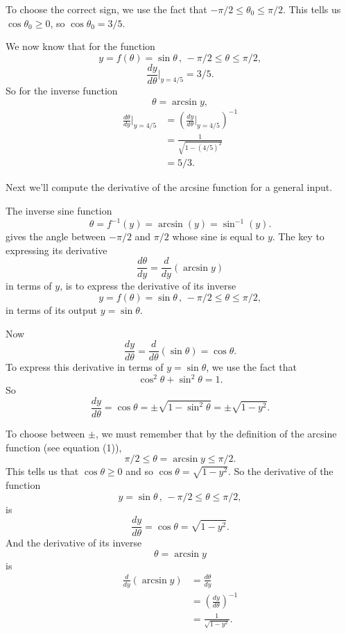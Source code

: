 \documentclass{ximera}
\begin{document}
\begin{example}
To choose the correct sign, we use the fact that $-\pi/2 \leq \theta_0 \leq \pi/2$. This tells us $\cos\theta_0 \geq 0$, so $\cos\theta_0 = 3/5$.

We now know that for the function
\[
  y = f(\theta) = \sin\theta \, , \, -\pi/2 \leq \theta \leq \pi/2 , 
\]
\[
    \frac{dy}{d\theta}\Big|_{y=4/5} = 3/5.
\]
So for the inverse function
\[
     \theta = \arcsin y ,
\]
\begin{align*}
 \frac{d\theta}{dy}\Big|_{y=4/5} &= \left( \frac{dy}{d\theta}\Big|_{y=4/5} \right)^{-1} \\
                                                & =\frac{1}{\sqrt{1-(4/5)^2}}  \\
                                                & = 5/3 .
\end{align*}

\end{example}

Next we'll compute the derivative of the arcsine function for a general input.




\begin{example} \label{Ecbfghnbng}
The inverse sine function
\[
    \theta = f^{-1}(y) = \arcsin(y) = \sin^{-1}(y) .
\]
gives the angle between $-\pi/2$ and $\pi/2$ whose sine is equal to $y$. The key to expressing its derivative
\[
  \frac{d\theta}{dy} = \frac{d}{dy}\left(  \arcsin y \right)
\]
in terms of $y$, is to express the derivative of its inverse
\[
 y=f(\theta) = \sin\theta \, , \, -\pi/2 \leq \theta \leq \pi/2, 
\]
in terms of its output $y=\sin\theta$.

Now
\[
     \frac{dy}{d\theta} = \frac{d}{d\theta} \left( \sin\theta \right) = \cos\theta .
\]
To express this derivative in terms of $y=\sin\theta$, we use the fact that 
\[
 \cos^2\theta + \sin^2\theta = 1 .
\]
So 
\[
      \frac{dy}{d\theta} = \cos\theta = \pm \sqrt{1-\sin^2\theta} = \pm \sqrt{1-y^2}.
\]

To choose between $\pm$, we must remember that by the definition of the arcsine function (see equation (1)), 
\[
   \pi/2 \leq \theta = \arcsin y \leq \pi/2 .
\]
This tells us that $\cos\theta \geq 0$ and so $\cos\theta = \sqrt{1-y^2}$. So the derivative of the function 
\[
     y = \sin\theta \, , \, -\pi/2 \leq \theta \leq \pi/2, 
\]
is
\[
       \frac{dy}{d\theta} = \cos\theta = \sqrt{1-y^2} .
\]
And the derivative of its inverse
\[
   \theta = \arcsin y
\]
is
\begin{align*}
 \frac{d}{dy}\left(  \arcsin y \right)   &= \frac{d\theta}{dy}\\
                                                      &= \left( \frac{dy}{d\theta} \right)^{-1}\\                      
                                                       &= \frac{1}{\sqrt{1-y^2}}.
\end{align*}
\end{example}
\end{document}

